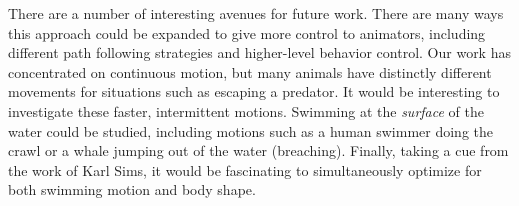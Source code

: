 There are a number of interesting avenues for future work.  There are many
ways this approach could be expanded to give more control to animators,
including different path following strategies and higher-level behavior
control.  Our work has concentrated on continuous motion, but many animals
have distinctly different movements for situations such as escaping a
predator.  It would be interesting to investigate these faster, intermittent
motions.  Swimming at the \emph{surface} of the water could be studied,
including motions such as a human swimmer doing the crawl or a whale jumping
out of the water (breaching).  Finally, taking a cue from the work of Karl
Sims, it would be fascinating to simultaneously optimize for both swimming
motion and body shape.
